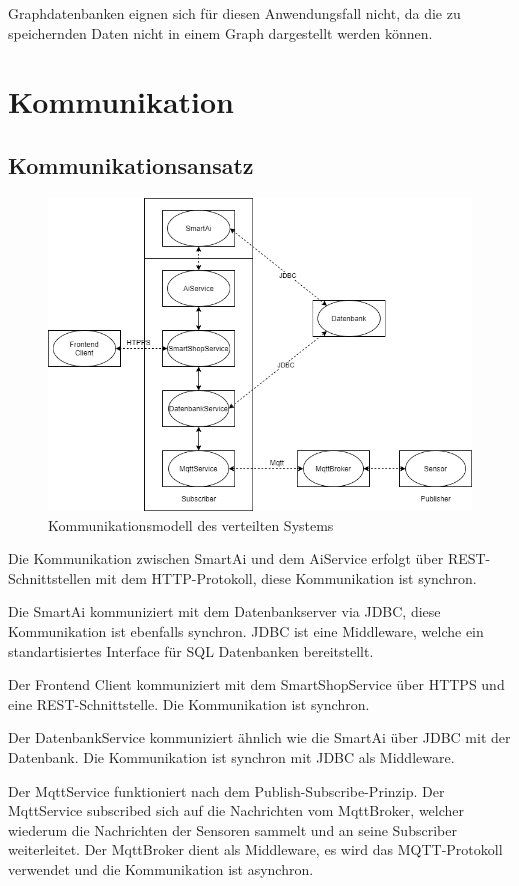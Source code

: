 \documentclass[runningheads]{llncs}
\begin{document}
Graphdatenbanken eignen sich für diesen Anwendungsfall nicht, da die zu speichernden Daten nicht in einem Graph dargestellt werden können.
\newpage

\section{Kommunikation}

\subsection{Kommunikationsansatz}
\begin{figure}
\includegraphics[width=\linewidth]{images/Kommunikation}
\caption{Kommunikationsmodell des verteilten Systems}
\end{figure}

Die Kommunikation zwischen SmartAi und dem AiService erfolgt über REST-Schnittstellen mit dem HTTP-Protokoll, diese Kommunikation ist synchron.

Die SmartAi kommuniziert mit dem Datenbankserver via JDBC, diese Kommunikation ist ebenfalls synchron. JDBC ist eine Middleware, welche ein standartisiertes Interface für SQL Datenbanken bereitstellt.

Der Frontend Client kommuniziert mit dem SmartShopService über HTTPS und eine REST-Schnittstelle. Die Kommunikation ist synchron.

Der DatenbankService kommuniziert ähnlich wie die SmartAi über JDBC mit der Datenbank. Die Kommunikation ist synchron mit JDBC als Middleware.

Der MqttService funktioniert nach dem Publish-Subscribe-Prinzip. Der MqttService subscribed sich auf die Nachrichten vom MqttBroker, welcher wiederum die Nachrichten der Sensoren sammelt und an seine Subscriber weiterleitet.
Der MqttBroker dient als Middleware, es wird das MQTT-Protokoll verwendet und die Kommunikation ist asynchron.
\end{document}
